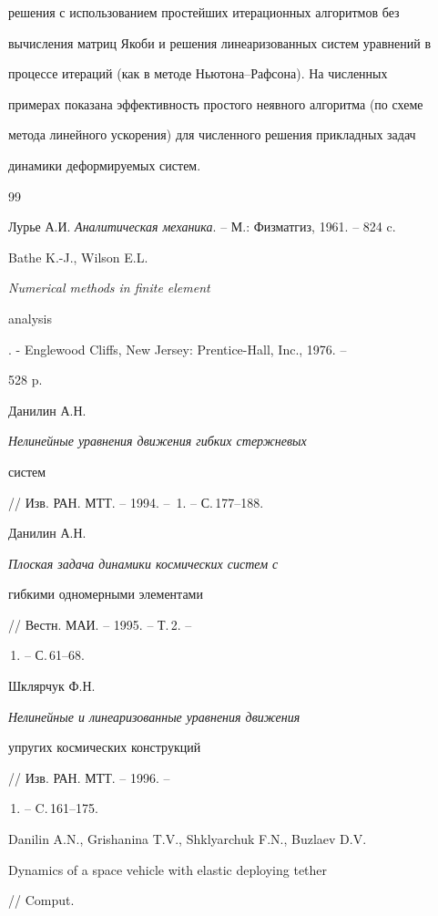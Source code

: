 решения с использованием простейших итерационных алгоритмов без 


вычисления матриц Якоби и решения линеаризованных систем уравнений в 


процессе итераций (как в методе Ньютона--Рафсона). На численных 


примерах показана эффективность простого неявного алгоритма (по схеме 


метода линейного ускорения) для численного решения прикладных задач 


динамики деформируемых систем. 


 


 


\begin{thebibliography}{99} 


 




Лурье А.И. {\em Аналитическая механика}. -- М.: Физматгиз, 1961. -- 824 c. 




Bathe K.-J., Wilson E.L. {\em Numerical methods in finite element 


analysis}. - Englewood Cliffs, New Jersey: Prentice-Hall, Inc., 1976. -- 


528 p. 




Данилин А.Н. {\em Нелинейные уравнения движения гибких стержневых 


систем} // Изв. РАН. МТТ. -- 1994. -- \No\,1. -- С.\,177--188. 




Данилин А.Н. {\em Плоская задача динамики космических систем с 


гибкими одномерными элементами} // Вестн. МАИ. -- 1995. -- Т.\,2. -- 


\No\,1. -- С.\,61--68. 




Шклярчук Ф.Н. {\em Нелинейные и линеаризованные уравнения движения 


упругих космических конструкций} // Изв. РАН. МТТ. -- 1996. -- 


\No\,1. -- C.\,161--175. 




Danilin A.N., Grishanina T.V., Shklyarchuk F.N., Buzlaev D.V. {\em 


Dynamics of a space vehicle with elastic deploying tether} // Comput. 



\end{thebibliography}
